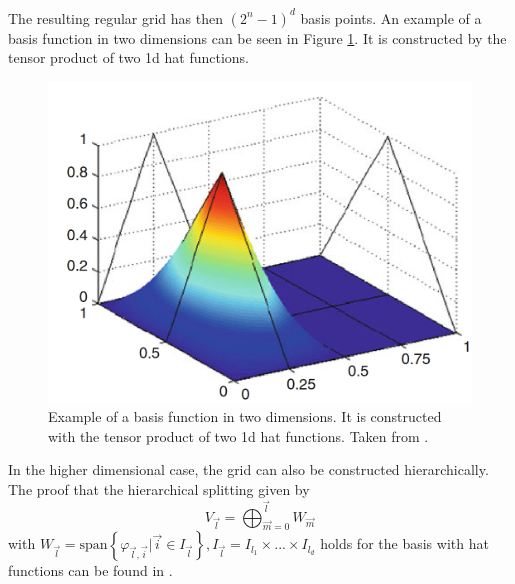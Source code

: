 The resulting regular grid has then $ (2^n - 1)^d $ basis points. An example of a basis function in two dimensions can be seen in Figure \ref{fig:2d_basis}. It is constructed by the tensor product of two 1d hat functions. 

\begin{figure}[H]
	\centering
	\includegraphics[scale=0.26]{figures/2d_basis.png}
	\caption{ Example of a basis function in two dimensions. It is constructed with the tensor product of two 1d hat functions. Taken from \cite{garcke2013sparse}. }
	\label{fig:2d_basis}
\end{figure}

In the higher dimensional case, the grid can also be constructed hierarchically. The proof that the hierarchical splitting given by 
\begin{equation}
	V_{\vec{l}} = \bigoplus_{\vec{m} = 0}^{\vec{l}} W_{\vec{m}}
\end{equation}
with $ W_{\vec{l}} = \text{span}\left\{\varphi_{\vec{l}, \vec{i}} | \vec{i} \in I_{\vec{l}}\right\}, I_{\vec{l}} = I_{l_1} \times ... \times I_{l_d} $ holds for the basis with hat functions can be found in \cite{b_splines}.


